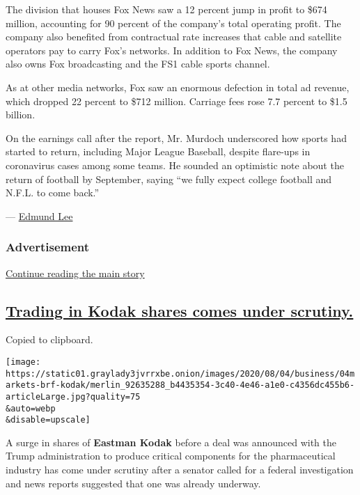 The division that houses Fox News saw a 12 percent jump in profit to
\$674 million, accounting for 90 percent of the company's total
operating profit. The company also benefited from contractual rate
increases that cable and satellite operators pay to carry Fox's
networks. In addition to Fox News, the company also owns Fox
broadcasting and the FS1 cable sports channel.

As at other media networks, Fox saw an enormous defection in total ad
revenue, which dropped 22 percent to \$712 million. Carriage fees rose
7.7 percent to \$1.5 billion.

On the earnings call after the report, Mr. Murdoch underscored how
sports had started to return, including Major League Baseball, despite
flare-ups in coronavirus cases among some teams. He sounded an
optimistic note about the return of football by September, saying ``we
fully expect college football and N.F.L. to come back.''

--- \href{https://www.nytimes3xbfgragh.onion/by/edmund-lee}{Edmund Lee}

\hypertarget{advertisement}{%
\subsubsection{Advertisement}\label{advertisement}}

\protect\hyperlink{after-dfp-ad-mid1}{Continue reading the main story}

\hypertarget{trading-in-kodak-shares-comes-under-scrutiny}{%
\subsection{\texorpdfstring{\protect\hyperlink{trading-in-kodak-shares-comes-under-scrutiny}{Trading
in Kodak shares comes under
scrutiny.}}{Trading in Kodak shares comes under scrutiny.}}\label{trading-in-kodak-shares-comes-under-scrutiny}}

Copied to clipboard.

\texttt{[image: https://static01.graylady3jvrrxbe.onion/images/2020/08/04/business/04markets-brf-kodak/merlin\_92635288\_b4435354-3c40-4e46-a1e0-c4356dc455b6-articleLarge.jpg?quality=75\\\&auto=webp\\\&disable=upscale]}

A surge in shares of \textbf{Eastman Kodak} before a deal was announced
with the Trump administration to produce critical components for the
pharmaceutical industry has come under scrutiny after a senator called
for a federal investigation and news reports suggested that one was
already underway.

